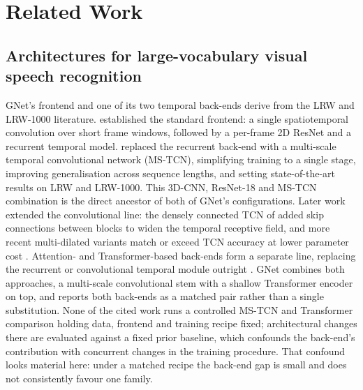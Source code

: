 \documentclass[10pt, a4paper]{article}
\begin{document}
\section{Related Work}
\subsection{Architectures for large-vocabulary visual speech recognition}
\noindent GNet's frontend and one of its two temporal back-ends derive from the LRW and LRW-1000 literature. \citet{stafylakis2017combining} established the standard frontend: a single spatiotemporal convolution over short frame windows, followed by a per-frame 2D ResNet and a recurrent temporal model. \citet{martinez2020lipreading} replaced the recurrent back-end with a multi-scale temporal convolutional network (MS-TCN), simplifying training to a single stage, improving generalisation across sequence lengths, and setting state-of-the-art results on LRW and LRW-1000. This 3D-CNN, ResNet-18 and MS-TCN combination is the direct ancestor of both of GNet's configurations. Later work extended the convolutional line: the densely connected TCN of \citet{ma2021densely} added skip connections between blocks to widen the temporal receptive field, and more recent multi-dilated variants match or exceed TCN accuracy at lower parameter cost \citep{lee2025td3net}. Attention- and Transformer-based back-ends form a separate line, replacing the recurrent or convolutional temporal module outright \citep{prajwal2022subword}.
\noindent GNet combines both approaches, a multi-scale convolutional stem with a shallow Transformer encoder on top, and reports both back-ends as a matched pair rather than a single substitution. None of the cited work runs a controlled MS-TCN and Transformer comparison holding data, frontend and training recipe fixed; architectural changes there are evaluated against a fixed prior baseline, which confounds the back-end's contribution with concurrent changes in the training procedure. That confound looks material here: under a matched recipe the back-end gap is small and does not consistently favour one family.
\end{document}
